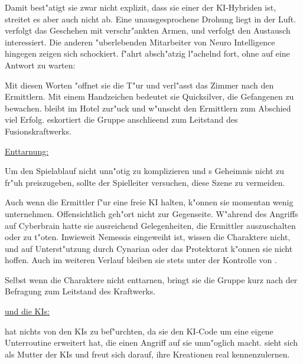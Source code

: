 
Damit best"atigt sie zwar nicht explizit, dass sie einer der KI-Hybriden ist, streitet es aber auch nicht ab. Eine unausgesprochene Drohung liegt in der Luft. \ml{} verfolgt das Geschehen mit verschr"ankten Armen, und verfolgt den Austausch interessiert. Die anderen "uberlebenden Mitarbeiter von Neuro Intelligence hingegen zeigen sich schockiert. \xl{} f"ahrt absch"atzig l"achelnd fort, ohne auf eine Antwort zu warten:


Mit diesen Worten "offnet sie die T"ur und verl"asst das Zimmer nach den Ermittlern. Mit einem Handzeichen bedeutet sie Quicksilver, die Gefangenen zu bewachen. \ml{} bleibt im Hotel zur"uck und w"unscht den Ermittlern zum Abschied viel Erfolg. \xl{} eskortiert die Gruppe anschlie\3end zum Leitstand des Fusionskraftwerks.

\begin{remarks}
	\underline{Enttarnung:}

	Um den Spielablauf nicht unn"otig zu komplizieren und \xl{}s Geheimnis nicht zu fr"uh preiszugeben, sollte der Spielleiter versuchen, diese Szene zu vermeiden.

	Auch wenn die Ermittler \xl{} f"ur eine freie KI halten, k"onnen sie momentan wenig unternehmen. Offensichtlich geh"ort \xl{} nicht zur Gegenseite. W"ahrend des Angriffs auf Cyberbrain hatte sie ausreichend Gelegenheiten, die Ermittler auszuschalten oder \ml{} zu t"oten. Inwieweit Nemessis eingeweiht ist, wissen die Charaktere nicht, und auf Unterst"utzung durch Cynarian oder das Protektorat k"onnen sie nicht hoffen. Auch im weiteren Verlauf bleiben sie stets unter der Kontrolle von \xl{}.
	
	Selbst wenn die Charaktere \xl{} nicht enttarnen, bringt sie die Gruppe kurz nach der Befragung zum Leitstand des Kraftwerks.

	\underline{\ml{} und die KIs:}

	\ml{} hat nichts von den KIs zu bef"urchten, da sie den KI-Code um eine eigene Unterroutine erweitert hat, die einen Angriff auf sie unm"oglich macht. \ml{} sieht sich als Mutter der KIs und freut sich darauf, ihre Kreationen real kennenzulernen.
\end{remarks}
